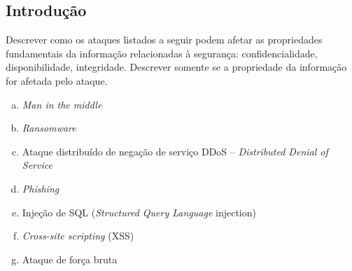 \subsection*{Introdução}

\exercise Descrever como os ataques listados a seguir podem 
afetar as propriedades fundamentais da informação relacionadas
à segurança: confidencialidade, disponibilidade, integridade. 
Descrever somente se a propriedade da informação for afetada 
pelo ataque.

\begin{enumerate}[a)]
\item {\it Man in the middle\/}
\item {\it Ransomware\/}
\item Ataque distribuído de negação de serviço {DDoS -- {\it Distributed Denial of Service\/}}
\item {\it Phishing\/}
\item Injeção de SQL ({\it Structured Query Language\/} injection)
\item {\it Cross-site scripting\/} (XSS)
\item Ataque de força bruta
\end{enumerate}
